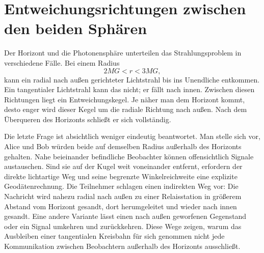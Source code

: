 \section{Entweichungsrichtungen zwischen den beiden Sphären}

Der Horizont und die Photonensphäre unterteilen das Strahlungsproblem in verschiedene Fälle. Bei einem Radius
\begin{equation}
2MG<r<3MG,
\end{equation}
kann ein radial nach außen gerichteter Lichtstrahl bis ins Unendliche entkommen. Ein tangentialer Lichtstrahl kann das nicht; er fällt nach innen. Zwischen diesen Richtungen liegt ein Entweichungskegel. Je näher man dem Horizont kommt, desto enger wird dieser Kegel um die radiale Richtung nach außen. Nach dem Überqueren des Horizonts schließt er sich vollständig.

\begin{classroomqa}
\end{classroomqa}

\begin{classroomqa}
\end{classroomqa}

Die letzte Frage ist absichtlich weniger eindeutig beantwortet. Man stelle sich vor, Alice und Bob würden beide auf demselben Radius außerhalb des Horizonts gehalten. Nahe beieinander befindliche Beobachter können offensichtlich Signale austauschen. Sind sie auf der Kugel weit voneinander entfernt, erfordern der direkte lichtartige Weg und seine begrenzte Winkelreichweite eine explizite Geodätenrechnung. Die Teilnehmer schlagen einen indirekten Weg vor: Die Nachricht wird nahezu radial nach außen zu einer Relaisstation in größerem Abstand vom Horizont gesandt, dort herumgeleitet und wieder nach innen gesandt. Eine andere Variante lässt einen nach außen geworfenen Gegenstand oder ein Signal umkehren und zurückkehren. Diese Wege zeigen, warum das Ausbleiben einer tangentialen Kreisbahn für sich genommen nicht jede Kommunikation zwischen Beobachtern außerhalb des Horizonts ausschließt.

